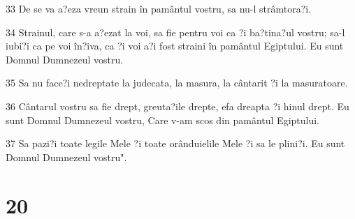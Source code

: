 \par 33 De se va a?eza vreun strain în pamântul vostru, sa nu-l strâmtora?i.
\par 34 Strainul, care s-a a?ezat la voi, sa fie pentru voi ca ?i ba?tina?ul vostru; sa-l iubi?i ca pe voi în?iva, ca ?i voi a?i fost straini în pamântul Egiptului. Eu sunt Domnul Dumnezeul vostru.
\par 35 Sa nu face?i nedreptate la judecata, la masura, la cântarit ?i la masuratoare.
\par 36 Cântarul vostru sa fie drept, greuta?ile drepte, efa dreapta ?i hinul drept. Eu sunt Domnul Dumnezeul vostru, Care v-am scos din pamântul Egiptului.
\par 37 Sa pazi?i toate legile Mele ?i toate orânduielile Mele ?i sa le plini?i. Eu sunt Domnul Dumnezeul vostru".

\chapter{20}

